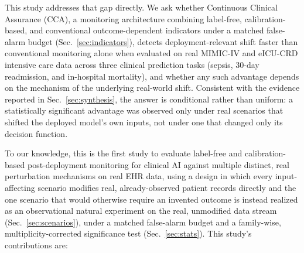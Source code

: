 \documentclass[apajournal,article,submit,oneauthor]{Definitions/mdpi}
\begin{document}
This study addresses that gap directly. We ask whether Continuous Clinical Assurance (CCA), a monitoring architecture combining label-free, calibration-based, and conventional outcome-dependent indicators under a matched false-alarm budget (Sec.~\ref{sec:indicators}), detects deployment-relevant shift faster than conventional monitoring alone when evaluated on real MIMIC-IV and eICU-CRD intensive care data across three clinical prediction tasks (sepsis, 30-day readmission, and in-hospital mortality), and whether any such advantage depends on the mechanism of the underlying real-world shift. Consistent with the evidence reported in Sec.~\ref{sec:synthesis}, the answer is conditional rather than uniform: a statistically significant advantage was observed only under real scenarios that shifted the deployed model's own inputs, not under one that changed only its decision function.

To our knowledge, this is the first study to evaluate label-free and calibration-based post-deployment monitoring for clinical AI against multiple distinct, real perturbation mechanisms on real EHR data, using a design in which every input-affecting scenario modifies real, already-observed patient records directly and the one scenario that would otherwise require an invented outcome is instead realized as an observational natural experiment on the real, unmodified data stream (Sec.~\ref{sec:scenarios}), under a matched false-alarm budget and a family-wise, multiplicity-corrected significance test (Sec.~\ref{sec:stats}). This study's contributions are:
\end{document}
